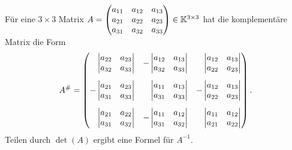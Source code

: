 \begin{bsp}[$ n=3 $]
	Für eine $3 \times 3$ Matrix $ A = \begin{pmatrix}
		a_{11} & a_{12} & a_{13} \\
		a_{21} & a_{22} & a_{23} \\
		a_{31} & a_{32} & a_{33}
	\end{pmatrix} \in \mathbb K^{3 \times 3} $
	hat die komplementäre Matrix die Form
	\[ A^\# = \begin{pmatrix}
		\phantom{-}\begin{vmatrix} a_{22} & a_{23} \\ a_{32} & a_{33} \end{vmatrix} & -\begin{vmatrix} a_{12} & a_{13} \\ a_{32} & a_{33} \end{vmatrix} & 
		\phantom{-}\begin{vmatrix} a_{12} & a_{13} \\ a_{22} & a_{23} \end{vmatrix}\vspace{3mm}
		 \\
		-\begin{vmatrix} a_{21} & a_{23} \\ a_{31} & a_{33} \end{vmatrix} & \phantom{-}\begin{vmatrix} a_{11} & a_{13} \\ a_{31} & a_{33} \end{vmatrix} & 
		-\begin{vmatrix} a_{12} & a_{13} \\ a_{22} & a_{23} \end{vmatrix}\vspace{3mm} \\
		\phantom{-}\begin{vmatrix} a_{21} & a_{22} \\ a_{31} & a_{32} \end{vmatrix}
		 & -\begin{vmatrix} a_{11} & a_{12} \\ a_{31} & a_{32} \end{vmatrix} & \phantom{-}\begin{vmatrix} a_{11} & a_{12} \\ a_{21} & a_{22} \end{vmatrix}
	\end{pmatrix}.
	\]
	Teilen durch $\det(A)$ ergibt eine Formel für $A^{-1}$. 
\end{bsp}

